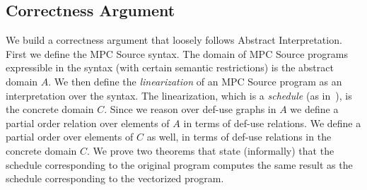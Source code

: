 \begin{algorithmic}

\ENDFOR

\ENDFOR
{}


\end{algorithmic}



\subsection{Correctness Argument}
\label{sec:correctness}

We build a correctness argument that loosely follows Abstract Interpretation.
First we define the MPC Source syntax. The domain of MPC Source programs
expressible in the syntax (with certain semantic restrictions) is the abstract domain $A$.
We then define the \emph{linearization} of an MPC Source program as an interpretation
over the syntax. The linearization, which is a \emph{schedule} (as in~), is the concrete domain $C$.
Since we reason over def-use graphs in $A$ we define a partial order relation over elements of $A$
in terms of def-use relations. We define a partial order over elements of $C$ as well,
in terms of def-use relations in the concrete domain $C$. We prove two theorems
that state (informally) that the schedule corresponding to the original program computes the same
result as the schedule corresponding to the vectorized program. 

